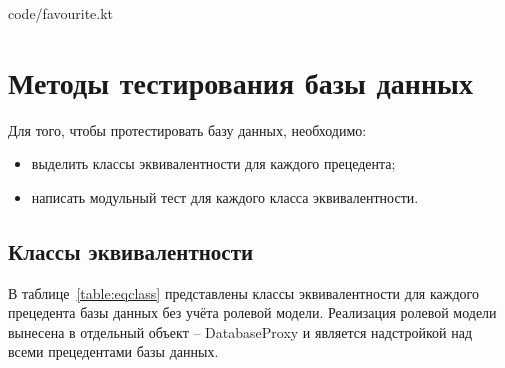  {code/favourite.kt}

\section{Методы тестирования базы данных}
Для того, чтобы протестировать базу данных, необходимо:
\begin{itemize}
    \item выделить классы эквивалентности для каждого прецедента;
    \item написать модульный тест для каждого класса эквивалентности.
\end{itemize}

\subsection{Классы эквивалентности}
В таблице~\ref{table:eqclass} представлены классы эквивалентности для каждого прецедента базы данных без учёта ролевой модели.
Реализация ролевой модели вынесена в отдельный объект -- DatabaseProxy и является надстройкой над всеми прецедентами базы данных.

